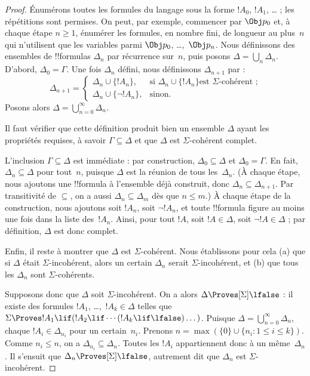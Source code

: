 \documentclass[../../../include/open-logic-section]{subfiles}
\begin{document}
\begin{proof}
Énumérons toutes les formules du langage sous la forme $!A_0$,
$!A_1$, \dots{} ; les répétitions sont permises. On peut, par exemple,
commencer par $\Obj p_0$ et, à chaque étape $n \ge 1$, énumérer les
formules, en nombre fini, de longueur au plus~$n$ qui n'utilisent que
les variables parmi $\Obj p_0$, \dots,~$\Obj p_n$. Nous définissons
des ensembles de !!{formula}s $\Delta_n$ par récurrence sur~$n$, puis
posons $\Delta = \bigcup_n \Delta_n$. D'abord, $\Delta_0 = \Gamma$.
Une fois $\Delta_n$ défini, nous définissons $\Delta_{n+1}$ par :
\[
\Delta_{n+1} =
\begin{cases}
  \Delta_n \cup \{!A_n\}, & \text{si $\Delta_n \cup \{ !A_n\}$
    est $\Sigma$-cohérent ;} \\
  \Delta_n \cup \{ \lnot !A_n\}, & \text{sinon.}
\end{cases}
\]
Posons alors $\Delta = \bigcup_{n=0}^\infty \Delta_n$.

Il faut vérifier que cette définition produit bien un ensemble $\Delta$
ayant les propriétés requises, à savoir $\Gamma \subseteq \Delta$ et
que $\Delta$ est $\Sigma$-cohérent complet.

L'inclusion $\Gamma \subseteq \Delta$ est immédiate : par
construction, $\Delta_0 \subseteq \Delta$ et $\Delta_0 = \Gamma$. En
fait, $\Delta_n \subseteq \Delta$ pour tout~$n$, puisque $\Delta$ est la
réunion de tous les~$\Delta_n$. (À chaque étape, nous ajoutons une
!!{formula} à l'ensemble déjà construit, donc $\Delta_n \subseteq
\Delta_{n+1}$. Par transitivité de $\subseteq$, on a aussi $\Delta_n
\subseteq \Delta_{m}$ dès que $n \le m$.) À chaque étape de la
construction, nous ajoutons soit $!A_n$, soit $\lnot !A_n$, et toute
!!{formula} figure au moins une fois dans la liste des~$!A_n$. Ainsi,
pour tout $!A$, soit $!A \in \Delta$, soit $\lnot !A \in \Delta$ ; par
définition, $\Delta$ est donc complet.

Enfin, il reste à montrer que $\Delta$ est $\Sigma$-cohérent. Nous
établissons pour cela (a) que si $\Delta$ était $\Sigma$-incohérent,
alors un certain $\Delta_n$ serait $\Sigma$-incohérent, et (b) que tous les
$\Delta_n$ sont $\Sigma$-cohérents.

Supposons donc que $\Delta$ soit $\Sigma$-incohérent. On a alors
$\Delta \Proves[\Sigma] \lfalse$ : il existe des formules $!A_1$,
\dots,~$!A_k \in \Delta$ telles que $\Sigma \Proves !A_1 \lif (!A_2
\lif \cdots (!A_k \lif \lfalse)\dots)$. Puisque $\Delta =
\bigcup_{n=0}^\infty \Delta_n$, chaque $!A_i \in \Delta_{n_i}$ pour un
certain~$n_i$. Prenons $n=\max(\{0\}\cup\{n_i : 1\le i\le k\})$. Comme $n_i \le
n$, on a $\Delta_{n_i} \subseteq \Delta_n$. Toutes les $!A_i$
appartiennent donc à un même~$\Delta_n$. Il s'ensuit que $\Delta_n
\Proves[\Sigma] \lfalse$, autrement dit que $\Delta_n$ est
$\Sigma$-incohérent.


\end{proof}
\end{document}
